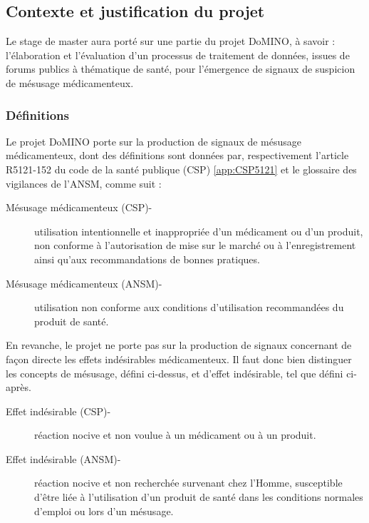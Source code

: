 \documentclass[a4paper, 12pt, openany, oneside, abstract=on]{article} %
\begin{document}
\subsection{Contexte et justification du projet}
Le stage de master aura porté sur une partie du projet DoMINO, à savoir : l'élaboration et l'évaluation d'un processus de traitement de données, issues de forums publics à thématique de santé, pour l'émergence de signaux de suspicion de mésusage médicamenteux\cite{DRUGS-SAFE}.\\

\subsubsection{Définitions}
Le projet DoMINO porte sur la production de signaux de mésusage médicamenteux, dont des définitions sont données par, respectivement l'article R5121-152 du code de la santé publique (CSP) \ref{app:CSP5121}\cite{LegiFrance} et le glossaire des vigilances de l'ANSM\cite{France2007}, comme suit :

\begin{description}
    \item[Mésusage médicamenteux (CSP)-] utilisation intentionnelle et inappropriée d'un médicament ou d'un produit, non conforme à l'autorisation de mise sur le marché ou à l'enregistrement ainsi qu'aux recommandations de bonnes pratiques.
    \item[Mésusage médicamenteux (ANSM)-] utilisation non conforme aux conditions d’utilisation recommandées du produit de santé.
\end{description}
En revanche, le projet ne porte pas sur la production de signaux concernant de façon directe les effets indésirables médicamenteux. Il faut donc bien distinguer les concepts de mésusage, défini ci-dessus, et d'effet indésirable, tel que défini ci-après.
\begin{description}
    \item[Effet indésirable (CSP)-] réaction nocive et non voulue à un médicament ou à un produit.
    \item[Effet indésirable (ANSM)-] réaction nocive et non recherchée survenant chez l’Homme, susceptible d’être liée à l’utilisation d’un produit de santé dans les conditions normales d’emploi ou lors d’un mésusage.
\end{description}
\end{document}
